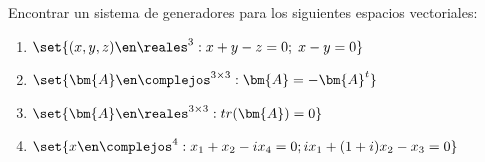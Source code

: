 \begin{enunciado}{\ejercicio}
  Encontrar un sistema de generadores para los siguientes espacios vectoriales:
  \begin{enumerate}[label=(\alph*)]
    \item $\set{
              (x,y,z) \en \reales^3 : x + y - z = 0;\; x - y = 0
            }$

    \item $\set{
              \bm{A} \en \complejos^{3 \times 3} : \bm{A} = - \bm{A}^t
            }$

    \item $\set{
              \bm{A} \en \reales^{3 \times 3} : tr(\bm{A}) = 0
            }$

    \item $\set{
              x \en \complejos^4 : x_1 + x_2 - i x_4 = 0;
              ix_1 + (1+i)x_2 - x_3 = 0
            }$
  \end{enumerate}
\end{enunciado}

